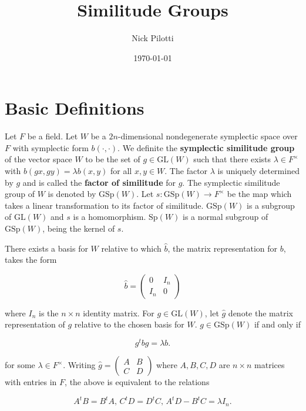 \documentclass[12pt]{article}
\title{Similitude Groups}
\author{Nick Pilotti}
\date{\today}
\begin{document}
\maketitle

\section{Basic Definitions}

Let $F$ be a field. Let $W$ be a $2n$-dimensional nondegenerate symplectic space
over $F$ with symplectic form $b\left(\cdot, \cdot\right)$. We definite the
\textbf{symplectic similitude group} of the vector space $W$ to be the set of $g
\in \text{GL}\left(W\right)$ such that there exists $\lambda \in F^{\times}$
with $b\left(gx, gy\right) = \lambda b\left(x, y\right)$ for all $x, y \in W$.
The factor $\lambda$ is uniquely determined by $g$ and is called the
\textbf{factor of similitude} for $g$. The symplectic similitude group of $W$ is
denoted by $\text{GSp}\left(W\right)$. Let $s : \text{GSp}\left(W\right)
\rightarrow F^{\times}$ be the map which takes a linear transformation to its
factor of similitude. $\text{GSp}\left(W\right)$ is a subgroup of
$\text{GL}\left(W\right)$ and $s$ is a homomorphism. $\text{Sp}\left(W\right)$
is a normal subgroup of $\text{GSp}\left(W\right)$, being the kernel of $s$.

There exists a basis for $W$ relative to which $\hat{b}$, the matrix
representation for $b$, takes the form 

\[\hat{b} = \begin{pmatrix} 0 & I_{n} \\ I_{n} & 0 \end{pmatrix}\]

where $I_{n}$ is the $n \times n$ identity matrix. For $g \in
\text{GL}\left(W\right)$, let $\hat{g}$ denote the matrix representation of $g$
relative to the chosen basis for $W$. $g \in \text{GSp}\left(W\right)$ if and
only if 

\[g^{t} b g = \lambda b.\]

for some $\lambda \in F^{\times}$. Writing $\hat{g} = \begin{pmatrix} A & B \\ C
& D \end{pmatrix}$ where $A, B, C, D$ are $n \times n$ matrices with entries in
$F$, the above is equivalent to the relations 

\[A^{t}B = B^{t}A, \, C^{t}D = D^{t}C, \, A^{t}D - B^{t}C = \lambda I_{n}.\]
\end{document}
